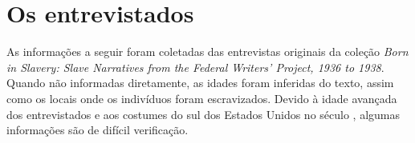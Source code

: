 \chapter{Os entrevistados}

As informações a seguir foram coletadas das entrevistas originais da
coleção \emph{Born in Slavery: Slave Narratives from the Federal
Writers' Project, 1936 to 1938}. Quando não informadas diretamente, as
idades foram inferidas do texto, assim como os locais onde os indivíduos
foram escravizados. Devido à idade avançada dos entrevistados e aos
costumes do sul dos Estados Unidos no século , algumas informações
são de difícil verificação.


